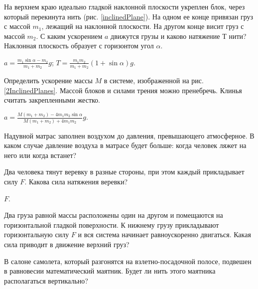 \begin{ex} %
На верхнем краю идеально гладкой наклонной плоскости укреплен блок, через который перекинута нить (рис. \ref{inclinedPlane}). На одном ее конце привязан груз с массой $m_1$, лежащий на наклонной плоскости. На другом конце висит груз с массой $m_2$. С каким ускорением $a$ движутся грузы и каково натяжение $Т$ нити? Наклонная плоскость образует с горизонтом угол $\alpha$.
\begin{ans}
$a = \frac{m_1 \sin \alpha - m_2}{m_1 + m_2}g$; $T = \frac{m_1 m_2}{m_1 + m_2}\left( 1+ \sin \alpha \right)g$.
\end{ans}
\end{ex}

\begin{ex} %
Определить ускорение массы $M$ в системе, изображенной на рис. \ref{2InclinedPlanes}. Массой блоков и силами трения можно пренебречь. Клинья считать закрепленными жестко.
\begin{ans}
$a = \frac{M(m_1 + m_2) - 4 m_1 m_2 \sin \alpha}{M(m_1 + m_2) + 4 m_1 m_2}g$.
\end{ans}
\end{ex}

\qualProblems

\begin{ex}
Надувной матрас заполнен воздухом до давления, превышающего атмосферное. В каком случае давление воздуха в матрасе будет больше: когда человек ляжет на него или когда встанет?
\end{ex}

\begin{ex} %
Два человека тянут веревку в разные стороны, при этом каждый прикладывает силу $F$. Какова сила натяжения веревки?
\begin{ans}
$F$.
\end{ans}
\end{ex}

\begin{ex} %
Два груза равной массы расположены один на другом и помещаются на горизонтальной гладкой поверхности. К нижнему грузу прикладывают горизонтальную силу $F$ и вся система начинает равноускоренно двигаться. Какая сила приводит в движение верхний груз?
\end{ex}

\begin{ex} %
В салоне самолета, который разгонятся на взлетно-посадочной полосе, подвешен в равновесии математический маятник. Будет ли нить этого маятника располагаться вертикально?
\end{ex}

